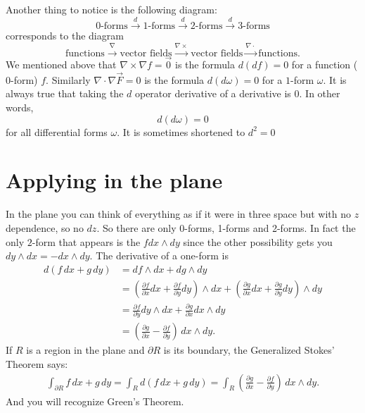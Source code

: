 \documentclass[12pt]{article}
\begin{document}
Another thing to notice is the following diagram:
\[
\text{0-forms} \overset{d}{\to}
\text{1-forms} \overset{d}{\to}
\text{2-forms} \overset{d}{\to}
\text{3-forms}
\]
corresponds to the diagram
\[
\text{functions} \overset{\nabla}{\to}
\text{vector fields} \overset{\nabla \times {}}{\to}
\text{vector fields} \overset{\nabla \cdot {}}{\to}
\text{functions} .
\]
We mentioned above that $\nabla \times \nabla f = \vec{0}$ is the formula $d(df) = 0$
for a function ($0$-form) $f$.
Similarly $\nabla \cdot \nabla \vec{F} = 0$ is the formula $d(d\omega) = 0$
for a $1$-form $\omega$.  It is always true that taking the $d$ operator derivative
of a derivative is $0$.  In other words,
\[
d(d\omega) = 0
\]
for all differential forms $\omega$.  It is sometimes shortened to $d^2 = 0$

\section*{Applying in the plane}

In the plane you can think of everything as if it were in three space but
with no $z$ dependence, so no $dz$.  So there are only 0-forms, 1-forms and 2-forms.
In fact the only $2$-form that appears is the $f dx \wedge dy$ since
the other possibility gets you $dy \wedge dx = - dx \wedge dy$.
The derivative of a one-form is
\begin{equation*}
\begin{split}
d(f \, dx + g \, dy)
& =
df \wedge dx + dg \wedge dy
\\
& =
\left(\frac{\partial f}{\partial x} dx + \frac{\partial f}{\partial y} dy \right)  \wedge dx
+
\left(\frac{\partial g}{\partial x} dx + \frac{\partial g}{\partial y} dy \right)  \wedge dy
\\
& =
\frac{\partial f}{\partial y} dy \wedge dx
+
\frac{\partial g}{\partial x} dx  \wedge dy
\\
& =
\left(\frac{\partial g}{\partial x} -
\frac{\partial f}{\partial y} \right) \,dx  \wedge dy .
\end{split}
\end{equation*}
If $R$ is a region in the plane and $\partial R$ is its boundary, 
the Generalized Stokes' Theorem says:
\begin{equation*}
\begin{split}
\int_{\partial R}
f \, dx + g \, dy
=
\int_R 
d (f \, dx + g \, dy)
=
\int_R
\left(\frac{\partial g}{\partial x} -
\frac{\partial f}{\partial y} \right) \,dx  \wedge dy .
\end{split}
\end{equation*}
And you will recognize Green's Theorem.
\end{document}
